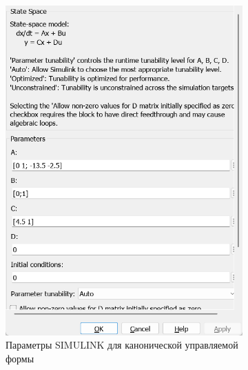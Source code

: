 \documentclass[a4paper, 12pt]{article}
\begin{document}
\begin{figure}[H]
\begin{subfigure}{0.3\textwidth}
            \includegraphics[width=\linewidth]{canonical_controlled_form_2_window.png}
            \caption{Параметры SIMULINK для канонической управляемой формы}
            \label{fig:ccf2w}
        \end{subfigure}
        \begin{subfigure}{0.3\textwidth}
            \centering

\end{subfigure}
\end{figure}
\end{document}
